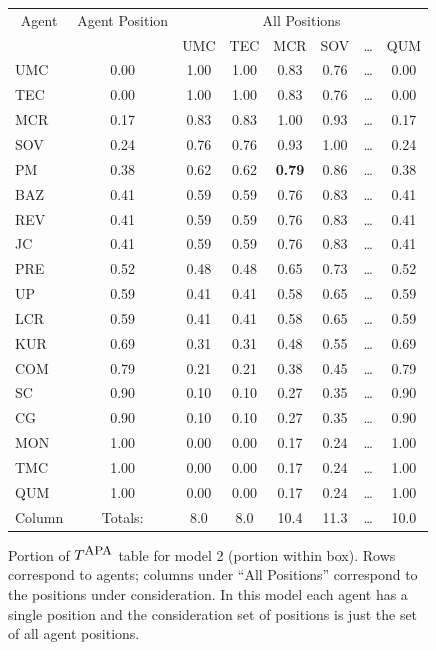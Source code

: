 \begin{enumerate}
\begin{figure}[h]
\centering
\begin{tabular}{lccccccc|} \hline
\multicolumn{1}{|c|}{Agent} & \multicolumn{1}{|c|}{Agent Position} & \multicolumn{6}{|c|}{All Positions} \\ \cline{1-8} 
	& &	UMC	& TEC & MCR	& SOV & \ldots & \multicolumn{1}{c}{QUM} \\ 
	\cline{3-8} 
UMC& 0.00 &	\multicolumn{1}{|c}{1.00} &	1.00	& 0.83 &	0.76 & \ldots  & 0.00 \\
TEC	& 0.00	& \multicolumn{1}{|c}{1.00} &	1.00	& 0.83	& 0.76 & \ldots & 0.00 \\
MCR	 & 0.17 &	\multicolumn{1}{|c}{0.83} &	0.83	& 1.00 &	0.93 & \ldots & 0.17 \\
SOV	& 0.24	& \multicolumn{1}{|c}{0.76} &	0.76	& 0.93 &	1.00 & \ldots & 0.24 \\
PM	& 0.38 &	\multicolumn{1}{|c}{0.62}	 & 0.62 &	{\bf 0.79} &	0.86 & \ldots & 0.38 \\
BAZ	& 0.41 &	\multicolumn{1}{|c}{0.59} &	0.59 &	0.76 &	0.83 & \ldots & 0.41 \\
REV	& 0.41 &	\multicolumn{1}{|c}{0.59} &	0.59 &	0.76 &	0.83 & \ldots & 0.41 \\
JC	& 0.41 &	\multicolumn{1}{|c}{0.59} &	0.59 &	0.76 &	0.83 & \ldots & 0.41 \\
PRE	& 0.52 &	\multicolumn{1}{|c}{0.48} &	0.48 &	0.65 &	0.73 & \ldots & 0.52 \\
UP	& 0.59	& \multicolumn{1}{|c}{0.41} &	0.41 &	0.58 &	0.65 & \ldots & 0.59 \\
LCR	& 0.59 &	\multicolumn{1}{|c}{0.41} &	0.41 & 	0.58 &	0.65 & \ldots & 0.59 \\
KUR	& 0.69 &	\multicolumn{1}{|c}{0.31} &	0.31 &	0.48 & 	0.55 & \ldots & 0.69 \\
COM	 & 0.79 &	\multicolumn{1}{|c}{0.21} &	0.21 &	0.38 &	0.45 & \ldots & 0.79 \\
SC & 	0.90 & 	\multicolumn{1}{|c}{0.10} & 	0.10 &	0.27 &	0.35 & \ldots & 0.90 \\
CG	& 0.90 & 	\multicolumn{1}{|c}{0.10} & 	0.10	 & 0.27 & 	0.35 & \ldots & 0.90 \\
MON & 	1.00 &	\multicolumn{1}{|c}{0.00} &	0.00 &	0.17 &	0.24 & \ldots & 1.00 \\
TMC	& 1.00 &	\multicolumn{1}{|c}{0.00} &	0.00 &	0.17 &	0.24 & \ldots & 1.00 \\
QUM &	1.00 &	\multicolumn{1}{|c}{0.00} &	0.00 &	0.17	 & 0.24 & \ldots & 1.00 \\
		\cline{3-8}			
Column & Totals: &		8.0 &	8.0	& 10.4	& 11.3 & \ldots & \multicolumn{1}{c}{10.0}
\end{tabular}
\caption{Portion of $T^{\mbox{\small APA}}$ table for model 2 (portion within box). Rows correspond to agents; columns under ``All Positions'' correspond to the positions under consideration. In this model each agent has a single position and the consideration set of positions is just the set of all agent positions.}
\label{fig:TAPA_model_2}
\end{figure}


\end{enumerate}
